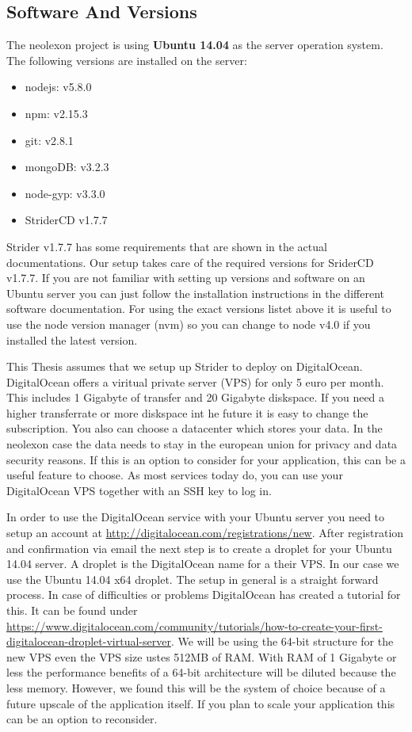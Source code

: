 \subsection{Software And Versions}
The neolexon project is using \textbf{Ubuntu 14.04} as the server operation system. The following versions are installed on the server:
\begin{itemize}
  \item nodejs: v5.8.0
  \item npm: v2.15.3
  \item git: v2.8.1
  \item mongoDB: v3.2.3
  \item node-gyp: v3.3.0
  \item StriderCD v1.7.7
\end{itemize}

Strider v1.7.7 has some requirements that are shown in the actual documentations. Our setup takes care of the required versions for SriderCD v1.7.7.
If you are not familiar with setting up versions and software on an Ubuntu server you can just follow the installation instructions in the different
software documentation. For using the exact versions listet above it is useful to use the node version manager (nvm) so you can change to node v4.0 if
you installed the latest version.

This Thesis assumes that we setup up Strider to deploy on DigitalOcean. DigitalOcean offers a viritual private server (VPS) for only 5 euro per month. This
includes 1 Gigabyte of transfer and 20 Gigabyte diskspace. If you need a higher transferrate or more diskspace int he future it is easy to change the
subscription. You also can choose a datacenter which stores your data. In the neolexon case the data needs to stay in the european union for privacy
and data security reasons. If this is an option to consider for your application, this can be a useful feature to choose. As most services today do, you
can use your DigitalOcean VPS together with an SSH key to log in.

In order to use the DigitalOcean service with your Ubuntu server you need to setup an account at \url{http://digitalocean.com/registrations/new}. After
registration and confirmation via email the next step is to create a droplet for your Ubuntu 14.04 server. A droplet is the DigitalOcean name for a  their VPS.
In our case we use the Ubuntu 14.04 x64 droplet. The setup in general is a straight forward process. In case of difficulties or problems DigitalOcean has
created a tutorial for this. It can be found under \url{https://www.digitalocean.com/community/tutorials/how-to-create-your-first-digitalocean-droplet-virtual-server}.
We will be using the 64-bit structure for the new VPS even the VPS size ustes 512MB of RAM. With RAM of 1 Gigabyte or less the performance benefits of a 64-bit architecture
will be diluted because the less memory. However, we found this will be the system of choice because of a future upscale of the application itself. If you plan
to scale your application this can be an option to reconsider.

